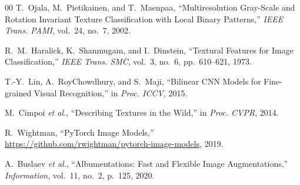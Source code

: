 \documentclass[conference]{IEEEtran}
\begin{document}
\begin{thebibliography}{00}
T.~Ojala, M.~Pietikainen, and T.~Maenpaa,
``Multiresolution Gray-Scale and Rotation Invariant Texture Classification with
Local Binary Patterns,'' \textit{IEEE Trans. PAMI}, vol.~24, no.~7, 2002.

R.~M.~Haralick, K.~Shanmugam, and I.~Dinstein,
``Textural Features for Image Classification,''
\textit{IEEE Trans. SMC}, vol.~3, no.~6, pp.~610--621, 1973.

T.-Y.~Lin, A.~RoyChowdhury, and S.~Maji,
``Bilinear CNN Models for Fine-grained Visual Recognition,''
in \textit{Proc. ICCV}, 2015.

M.~Cimpoi \textit{et al.},
``Describing Textures in the Wild,''
in \textit{Proc. CVPR}, 2014.

R.~Wightman,
``PyTorch Image Models,'' \url{https://github.com/rwightman/pytorch-image-models}, 2019.

A.~Buslaev \textit{et al.},
``Albumentations: Fast and Flexible Image Augmentations,''
\textit{Information}, vol.~11, no.~2, p.~125, 2020.

\end{thebibliography}
\end{document}
